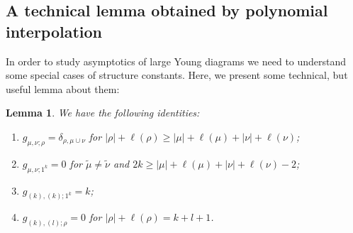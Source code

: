 \documentclass[11pt]{amsart}
\theoremstyle{plain}
\newtheorem{lemma}{Lemma}[section]
\theoremstyle{remark}
\begin{document}
\subsection{A technical lemma obtained by polynomial interpolation}

In order to study asymptotics of large Young diagrams we need to understand some special cases of structure constants. 
Here, we present some technical, but useful lemma about them:

\begin{lemma}
\label{lem:SC}
We have the following identities:
\begin{enumerate}
\item
\label{eq:SC-1} 
$g_{\mu,\nu;\rho} = \delta_{\rho, \mu \cup \nu}$ for $|\rho| + \ell(\rho) \geq |\mu| + \ell(\mu) + |\nu| + \ell(\nu)$;
\item
\label{eq:SC-2}
$g_{\mu,\nu;1^k} = 0$ for $\tilde{\mu} \neq \tilde{\nu}$ and 
$2k \geq |\mu| + \ell(\mu) + |\nu| + \ell(\nu) - 2$; 
\item 
\label{eq:SC-3}
$g_{(k),(k);1^k} = k$;
\item
\label{eq:SC-4} 
$g_{(k),(l);\rho} = 0$ for $|\rho| + \ell(\rho) = k+l+1$.
\end{enumerate}
\end{lemma}
\end{document}

